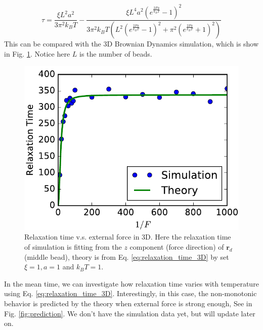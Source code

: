 \documentclass[12pt,a4paper]{article}
\begin{document}
\begin{equation}
    \label{eq:relaxation_time_3D}
    \tau = \frac{\xi L^2 a^2}{3 \pi^2 k_{B} T} - \frac{\xi L^4 a^2 \left(e^{\frac{2 F a}{k_{B} T}} - 1\right)^2} {3 \pi^2 k_{B} T \left(L^2 \left(e^{\frac{2 F a}{k_{B}T}} - 1\right)^2 + \pi^2 \left(e^{\frac{2 F a}{k_{B}T}} + 1\right)^2\right)} 
\end{equation}
This can be compared with the 3D Brownian Dynamics simulation, which is show in
Fig. \ref{fig:relaxation3D}. Notice here $L$ is the number of beads. 
\begin{figure}[htpb]
    \centering
    \includegraphics[width=0.8\linewidth]{relaxation3D.pdf}
    \caption{Relaxation time v.s. external force in 3D. Here the relaxation
        time of simulation is fitting from the $z$ component (force direction)
        of $\mathbf{r}_d$ (middle bead), theory is from Eq.
        \eqref{eq:relaxation_time_3D} by set $\xi=1, a=1$ and $k_B T=1$.}
    \label{fig:relaxation3D}
\end{figure}

In the mean time, we can investigate how relaxation time varies with
temperature using Eq. \eqref{eq:relaxation_time_3D}. Interestingly, in this
case, the non-monotonic behavior is predicted by the theory when external force
is strong enough, See in Fig. \ref{fig:prediction}. We don't have the simulation
data yet, but will update later on.
\end{document}
